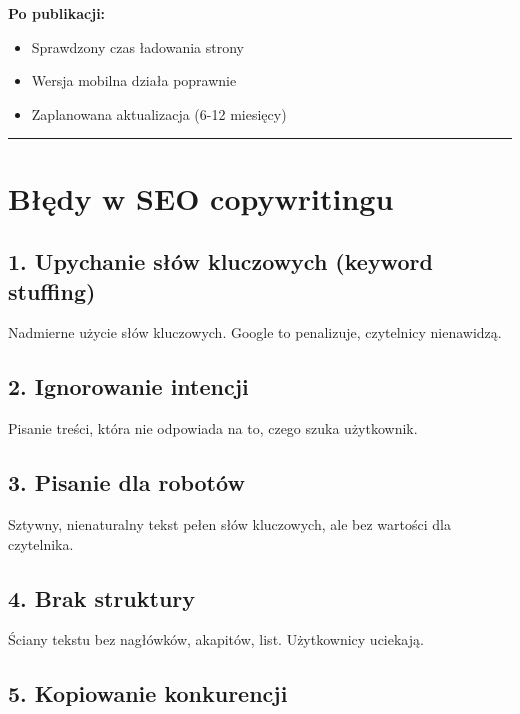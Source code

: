 \documentclass[
  12pt,
  a4paper,
  twoside,
  openright,
  12pt,
  DIV=12,
  BCOR=12mm]{scrbook}
\providecommand{\tightlist}{%
  \setlength{\itemsep}{0pt}\setlength{\parskip}{0pt}}\usepackage{longtable,booktabs,array}
\newcommand{\decoline}{%
  \begin{center}
    \textcolor{bordergray}{\rule{0.3\textwidth}{0.5pt}}
  \end{center}
}
\begin{document}
\textbf{Po publikacji:}

\begin{itemize}
\tightlist
\item[$\square$]
  Sprawdzony czas ładowania strony
\item[$\square$]
  Wersja mobilna działa poprawnie
\item[$\square$]
  Zaplanowana aktualizacja (6-12 miesięcy)
\end{itemize}

\decoline

\section{Błędy w SEO
copywritingu}\label{bux142ux119dy-w-seo-copywritingu}

\subsection{1. Upychanie słów kluczowych (keyword
stuffing)}\label{upychanie-sux142uxf3w-kluczowych-keyword-stuffing}

Nadmierne użycie słów kluczowych. Google to penalizuje, czytelnicy
nienawidzą.

\subsection{2. Ignorowanie intencji}\label{ignorowanie-intencji}

Pisanie treści, która nie odpowiada na to, czego szuka użytkownik.

\subsection{3. Pisanie dla robotów}\label{pisanie-dla-robotuxf3w}

Sztywny, nienaturalny tekst pełen słów kluczowych, ale bez wartości dla
czytelnika.

\subsection{4. Brak struktury}\label{brak-struktury}

Ściany tekstu bez nagłówków, akapitów, list. Użytkownicy uciekają.

\subsection{5. Kopiowanie konkurencji}\label{kopiowanie-konkurencji}
\end{document}
